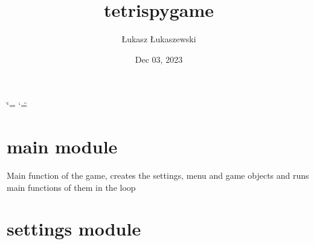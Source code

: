 \documentclass[letterpaper,10pt,english]{sphinxmanual}
\title{tetris\sphinxhyphen{}pygame}
\date{Dec 03, 2023}
\author{Łukasz Łukaszewski}
\begin{document}
\ifdefined\shorthandoff
  \ifnum\catcode`\=\string=\active\shorthandoff{=}\fi
  \ifnum\catcode`\"=\active{}\fi
\fi

\pagestyle{empty}
\sphinxmaketitle
\pagestyle{plain}
\sphinxtableofcontents
\pagestyle{normal}
\label{\detokenize{index::doc}}


\sphinxstepscope


\chapter{main module}
\label{\detokenize{main:module-main}}\label{\detokenize{main:main-module}}\label{\detokenize{main::doc}}

\begin{fulllineitems}
\label{\detokenize{main:main.main}}
\pysigstartsignatures
{}
\pysigstopsignatures
\sphinxAtStartPar
Main function of the game, creates the settings, menu and game objects and runs main functions of them in the loop

\end{fulllineitems}


\sphinxstepscope


\chapter{settings module}
\label{\detokenize{settings:module-settings}}\label{\detokenize{settings:settings-module}}\label{\detokenize{settings::doc}}
\end{document}
